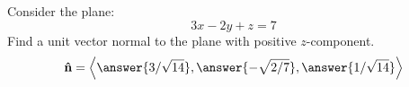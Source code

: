 \documentclass{ximera}
\author{Bart Snapp}
\begin{document}
\begin{exercise}
Consider the plane:
\[
3x-2y+z=7
\]
Find a unit vector normal to the plane with positive $z$-component.
\[
\unormal = \vector{\answer{3/\sqrt{14}},\answer{-\sqrt{2/7}},\answer{1/\sqrt{14}}}
\]
\end{exercise}
\end{document}

